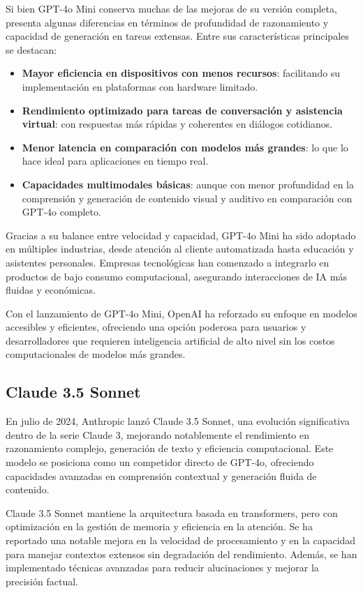 Si bien GPT-4o Mini conserva muchas de las mejoras de su versión completa, presenta algunas diferencias en términos de profundidad de razonamiento y capacidad de generación en tareas extensas. 
Entre sus características principales se destacan:
\begin{itemize}
    \item \textbf{Mayor eficiencia en dispositivos con menos recursos}: facilitando su implementación en plataformas con hardware limitado.
    \item \textbf{Rendimiento optimizado para tareas de conversación y asistencia virtual}: con respuestas más rápidas y coherentes en diálogos cotidianos.
    \item \textbf{Menor latencia en comparación con modelos más grandes}: lo que lo hace ideal para aplicaciones en tiempo real.
    \item \textbf{Capacidades multimodales básicas}: aunque con menor profundidad en la comprensión y generación de contenido visual y auditivo en comparación con GPT-4o completo.
\end{itemize}

Gracias a su balance entre velocidad y capacidad, GPT-4o Mini ha sido adoptado en múltiples industrias, desde atención al cliente automatizada hasta educación y asistentes personales. 
Empresas tecnológicas han comenzado a integrarlo en productos de bajo consumo computacional, asegurando interacciones de IA más fluidas y económicas.

Con el lanzamiento de GPT-4o Mini, OpenAI ha reforzado su enfoque en modelos accesibles y eficientes, ofreciendo una opción poderosa para usuarios y desarrolladores que requieren inteligencia artificial de alto nivel sin los costos computacionales de modelos más grandes. 


\subsection{Claude 3.5 Sonnet}

En julio de 2024, Anthropic lanzó Claude 3.5 Sonnet, una evolución significativa dentro de la serie Claude 3, mejorando notablemente el rendimiento en razonamiento complejo, generación de texto y eficiencia computacional. 
Este modelo se posiciona como un competidor directo de GPT-4o, ofreciendo capacidades avanzadas en comprensión contextual y generación fluida de contenido.

Claude 3.5 Sonnet mantiene la arquitectura basada en transformers, pero con optimización en la gestión de memoria y eficiencia en la atención. 
Se ha reportado una notable mejora en la velocidad de procesamiento y en la capacidad para manejar contextos extensos sin degradación del rendimiento. 
Además, se han implementado técnicas avanzadas para reducir alucinaciones y mejorar la precisión factual.

